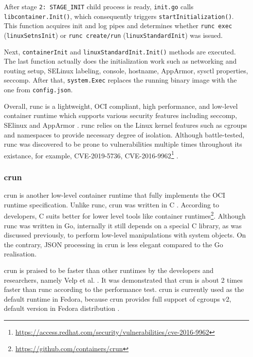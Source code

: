 After stage \texttt{2: STAGE\_INIT} child process is ready, \texttt{init.go} calls \linebreak \texttt{libcontainer.Init()}, which consequently triggers \texttt{startInitialization()}. This function acquires init and log pipes and determines whether \texttt{runc exec} (\texttt{linuxSetnsInit}) or \linebreak \texttt{runc create/run} (\texttt{linuxStandardInit}) was issued.

Next, \texttt{containerInit} and \texttt{linuxStandardInit.Init()} methods are executed. The last function actually does the initialization work such as networking and routing setup, SELinux labeling, console, hostname, AppArmor, sysctl properties, seccomp. After that, \texttt{system.Exec} replaces the running binary image with the one from \texttt{config.json}.

Overall, runc is a lightweight, OCI compliant, high performance, and low-level container runtime which supports various security features including seccomp, SElinux and AppArmor \cite{c:5}. runc relies on the Linux kernel features such as cgroups and namespaces to provide necessary degree of isolation. Although battle-tested, runc was discovered to be prone to vulnerabilities multiple times throughout its existance, for example, CVE-2019-5736, CVE-2016-9962\footnote{\url{https://access.redhat.com/security/vulnerabilities/cve-2016-9962}} \cite{s:unit42}.

\subsubsection*{crun}

crun is another low-level container runtime that fully implements the OCI runtime specification. Unlike runc, crun was written in C \cite{d:implementations}. According to developers, C suits better for lower level tools like container runtimes\footnote{\url{https://github.com/containers/crun}}. Although runc was written in Go, internally it still depends on a special C library, as was discussed previously, to perform low-level manipulations with system objects. On the contrary, JSON processing in crun is less elegant compared to the Go realisation.

crun is praised to be faster than other runtimes by the developers and researchers, namely Velp et al. \cite{c:6}. It was demonstrated that crun is about 2 times faster than runc according to the performance test. crun is currently used as the default runtime in Fedora, because crun provides full support of cgroups v2, default version in Fedora distribution \cite{c:7}.

